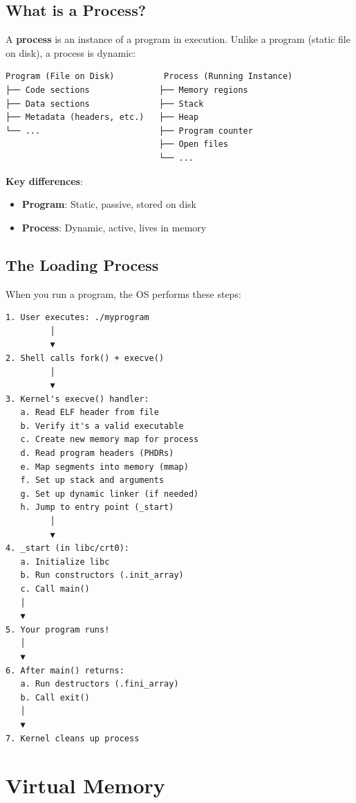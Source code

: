 \subsection{What is a Process?}

A \textbf{process} is an instance of a program in execution. Unlike a program (static file on disk), a process is dynamic:

\begin{verbatim}
Program (File on Disk)          Process (Running Instance)
├── Code sections              ├── Memory regions
├── Data sections              ├── Stack
├── Metadata (headers, etc.)   ├── Heap
└── ...                        ├── Program counter
                               ├── Open files
                               └── ...
\end{verbatim}

\textbf{Key differences}:
\begin{itemize}
    \item \textbf{Program}: Static, passive, stored on disk
    \item \textbf{Process}: Dynamic, active, lives in memory
\end{itemize}

\subsection{The Loading Process}

When you run a program, the OS performs these steps:

\begin{verbatim}
1. User executes: ./myprogram
         │
         ▼
2. Shell calls fork() + execve()
         │
         ▼
3. Kernel's execve() handler:
   a. Read ELF header from file
   b. Verify it's a valid executable
   c. Create new memory map for process
   d. Read program headers (PHDRs)
   e. Map segments into memory (mmap)
   f. Set up stack and arguments
   g. Set up dynamic linker (if needed)
   h. Jump to entry point (_start)
         │
         ▼
4. _start (in libc/crt0):
   a. Initialize libc
   b. Run constructors (.init_array)
   c. Call main()
   │
   ▼
5. Your program runs!
   │
   ▼
6. After main() returns:
   a. Run destructors (.fini_array)
   b. Call exit()
   │
   ▼
7. Kernel cleans up process
\end{verbatim}

\section{Virtual Memory}

